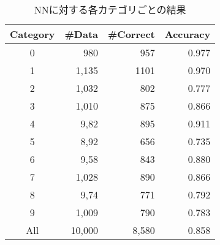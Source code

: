 \documentclass[class=jsarticle, crop=false, dvipdfmx, fleqn]{standalone}
\begin{document}
\begin{table}[H]
	\centering
	\caption{NNに対する各カテゴリごとの結果}
	\begin{tabular}{crrr}
		Category & {\#}Data & {\#}Correct & Accuracy \\ \hline
        0 & 980 & 957 & 0.977 \\
        1 & 1,135 & 1101 & 0.970 \\
        2 & 1,032 & 802 & 0.777 \\
        3 & 1,010 & 875 & 0.866 \\
        4 & 9,82 & 895 & 0.911 \\
        5 & 8,92 & 656 & 0.735 \\
        6 & 9,58 & 843 & 0.880 \\
        7 & 1,028 & 890 & 0.866 \\
        8 & 9,74 & 771 & 0.792 \\
        9 & 1,009 & 790 & 0.783 \\
        All & 10,000 & 8,580 & 0.858 \\
	\end{tabular}
	\label{tab:result_NN}
\end{table}
\end{document}
